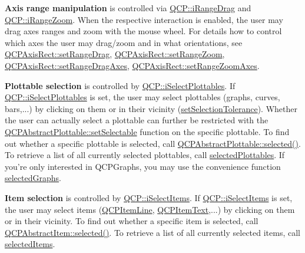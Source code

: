 {\bfseries Axis range manipulation} is controlled via \hyperlink{namespace_q_c_p_a2ad6bb6281c7c2d593d4277b44c2b037a2c4432b9aceafb94000be8d1b589ef18}{Q\-C\-P\-::i\-Range\-Drag} and \hyperlink{namespace_q_c_p_a2ad6bb6281c7c2d593d4277b44c2b037abee1e94353525a636aeaf0ba32b72e14}{Q\-C\-P\-::i\-Range\-Zoom}. When the respective interaction is enabled, the user may drag axes ranges and zoom with the mouse wheel. For details how to control which axes the user may drag/zoom and in what orientations, see \hyperlink{class_q_c_p_axis_rect_ae6aef2f7211ba6097c925dcd26008418}{Q\-C\-P\-Axis\-Rect\-::set\-Range\-Drag}, \hyperlink{class_q_c_p_axis_rect_a7960a9d222f1c31d558b064b60f86a31}{Q\-C\-P\-Axis\-Rect\-::set\-Range\-Zoom}, \hyperlink{class_q_c_p_axis_rect_a648cce336bd99daac4a5ca3e5743775d}{Q\-C\-P\-Axis\-Rect\-::set\-Range\-Drag\-Axes}, \hyperlink{class_q_c_p_axis_rect_a9442cca2aa358405f39a64d51eca13d2}{Q\-C\-P\-Axis\-Rect\-::set\-Range\-Zoom\-Axes}.

{\bfseries Plottable selection} is controlled by \hyperlink{namespace_q_c_p_a2ad6bb6281c7c2d593d4277b44c2b037a67148c8227b4155eca49135fc274c7ec}{Q\-C\-P\-::i\-Select\-Plottables}. If \hyperlink{namespace_q_c_p_a2ad6bb6281c7c2d593d4277b44c2b037a67148c8227b4155eca49135fc274c7ec}{Q\-C\-P\-::i\-Select\-Plottables} is set, the user may select plottables (graphs, curves, bars,...) by clicking on them or in their vicinity (\hyperlink{class_q_custom_plot_a4dc31241d7b09680950e19e5f971ed93}{set\-Selection\-Tolerance}). Whether the user can actually select a plottable can further be restricted with the \hyperlink{class_q_c_p_abstract_plottable_a22c69299eb5569e0f6bf084877a37dc4}{Q\-C\-P\-Abstract\-Plottable\-::set\-Selectable} function on the specific plottable. To find out whether a specific plottable is selected, call \hyperlink{class_q_c_p_abstract_plottable_ab901903adcb0e29467d63de72340ab29}{Q\-C\-P\-Abstract\-Plottable\-::selected()}. To retrieve a list of all currently selected plottables, call \hyperlink{class_q_custom_plot_a6721b8c689bb7f2f400987e580508fe8}{selected\-Plottables}. If you're only interested in Q\-C\-P\-Graphs, you may use the convenience function \hyperlink{class_q_custom_plot_ad2a0493bdd01e7aa99a4209ae3a5b67b}{selected\-Graphs}.

{\bfseries Item selection} is controlled by \hyperlink{namespace_q_c_p_a2ad6bb6281c7c2d593d4277b44c2b037aea2f7c105d674e76d9b187b02ef29260}{Q\-C\-P\-::i\-Select\-Items}. If \hyperlink{namespace_q_c_p_a2ad6bb6281c7c2d593d4277b44c2b037aea2f7c105d674e76d9b187b02ef29260}{Q\-C\-P\-::i\-Select\-Items} is set, the user may select items (\hyperlink{class_q_c_p_item_line}{Q\-C\-P\-Item\-Line}, \hyperlink{class_q_c_p_item_text}{Q\-C\-P\-Item\-Text},...) by clicking on them or in their vicinity. To find out whether a specific item is selected, call \hyperlink{class_q_c_p_abstract_item_a225865808640d8d9a7dd19f09a2e93f2}{Q\-C\-P\-Abstract\-Item\-::selected()}. To retrieve a list of all currently selected items, call \hyperlink{class_q_custom_plot_a1a48b13547e2d9ac5cd6927516f47a2e}{selected\-Items}.


